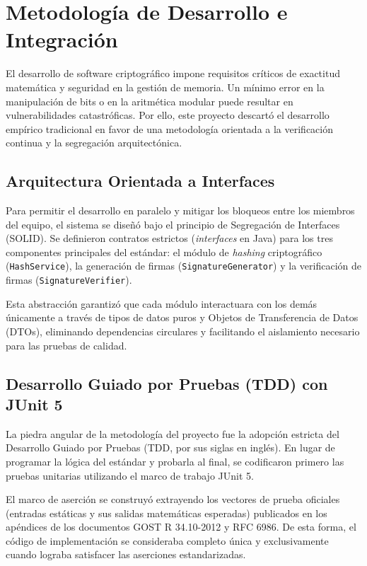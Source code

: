 \section{Metodología de Desarrollo e Integración}

El desarrollo de software criptográfico impone requisitos críticos de exactitud matemática y seguridad en la gestión de memoria. Un mínimo error en la manipulación de bits o en la aritmética modular puede resultar en vulnerabilidades catastróficas. Por ello, este proyecto descartó el desarrollo empírico tradicional en favor de una metodología orientada a la verificación continua y la segregación arquitectónica.

\subsection{Arquitectura Orientada a Interfaces}
Para permitir el desarrollo en paralelo y mitigar los bloqueos entre los miembros del equipo, el sistema se diseñó bajo el principio de Segregación de Interfaces (SOLID). Se definieron contratos estrictos (\textit{interfaces} en Java) para los tres componentes principales del estándar: el módulo de \textit{hashing} criptográfico (\texttt{HashService}), la generación de firmas (\texttt{SignatureGenerator}) y la verificación de firmas (\texttt{SignatureVerifier}). 

Esta abstracción garantizó que cada módulo interactuara con los demás únicamente a través de tipos de datos puros y Objetos de Transferencia de Datos (DTOs), eliminando dependencias circulares y facilitando el aislamiento necesario para las pruebas de calidad.

\subsection{Desarrollo Guiado por Pruebas (TDD) con JUnit 5}
La piedra angular de la metodología del proyecto fue la adopción estricta del Desarrollo Guiado por Pruebas (TDD, por sus siglas en inglés). En lugar de programar la lógica del estándar y probarla al final, se codificaron primero las pruebas unitarias utilizando el marco de trabajo JUnit 5. 

El marco de aserción se construyó extrayendo los vectores de prueba oficiales (entradas estáticas y sus salidas matemáticas esperadas) publicados en los apéndices de los documentos GOST R 34.10-2012 y RFC 6986. De esta forma, el código de implementación se consideraba completo única y exclusivamente cuando lograba satisfacer las aserciones estandarizadas.

